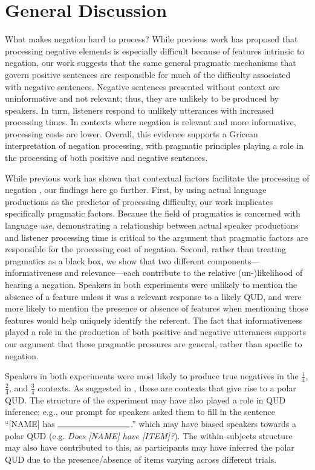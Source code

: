 \documentclass[man, floatsintext, noapacite]{apa6}
\begin{document}
\section{General Discussion}

What makes negation hard to process? While previous work has proposed that processing negative elements is especially difficult because of features intrinsic to negation, our work suggests that the same general pragmatic mechanisms that govern positive sentences are responsible for much of the difficulty associated with negative sentences. Negative sentences presented without context are uninformative and not relevant; thus, they are unlikely to be produced by speakers. In turn, listeners respond to unlikely utterances with increased processing times. In contexts where negation is relevant and more informative, processing costs are lower. Overall, this evidence supports a Gricean interpretation of negation processing, with pragmatic principles playing a role in the processing of both positive and negative sentences.

While previous work has shown that contextual factors facilitate the processing of negation \cite{wason1965,nieuwland2008,dale2011,orenes2014}, our findings here go further. First, by using actual language productions as the predictor of processing difficulty, our work implicates specifically pragmatic factors. Because the field of pragmatics is concerned with language \textit{use}, demonstrating a relationship between actual speaker productions and listener processing time is critical to the argument that pragmatic factors are responsible for the processing cost of negation. Second, rather than treating pragmatics as a black box, we show that two different components---informativeness and relevance---each contribute to the relative (un-)likelihood of hearing a negation. Speakers in both experiments were unlikely to mention the absence of a feature unless it was a relevant response to a likely QUD, and were more likely to mention the presence or absence of features when mentioning those features would help uniquely identify the referent. The fact that informativeness played a role in the production of both positive and negative utterances supports our argument that these pragmatic pressures are general, rather than specific to negation. 

Speakers in both experiments were most likely to produce true negatives in the $\frac{1}{4}$, $\frac{2}{4}$, and $\frac{3}{4}$ contexts. As suggested in , these are contexts that give rise to a polar QUD. The structure of the experiment may have also played a role in QUD inference; e.g., our prompt for speakers asked them to fill in the sentence ``[NAME] has $\rule{3cm}{0.15mm}$.'' which may have biased speakers towards a polar QUD (e.g. \textit{Does [NAME] have [ITEM]?}). The within-subjects structure may also have contributed to this, as participants may have inferred the polar QUD due to the presence/absence of items varying across different trials.
\end{document}
